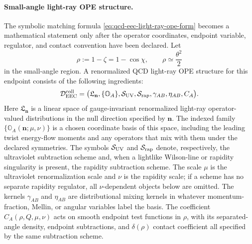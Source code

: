 \paragraph{Small-angle light-ray OPE structure.}
The symbolic matching formula \eqref{eq:qcd-eec-light-ray-ope-form} becomes
a mathematical statement only after the operator coordinates, endpoint
variable, regulator, and contact convention have been declared.  Let
\[
  \rho:=1-\zeta=1-\cos\chi,\qquad
  \rho\simeq \frac{\theta^2}{2}
\]
in the small-angle region.  A renormalized QCD light-ray OPE structure for this
endpoint consists of the following ingredients:
\[
  \mathcal D_{\rm EEC}^{\rm coll}
  =
  \bigl(
    \mathfrak L_{\mathbf n},\{\mathbb O_A\},
    \mathcal S_{\rm UV},\mathcal S_{\rm rap},
    \gamma_{AB},\eta_{AB},C_A
  \bigr).
\]
Here \(\mathfrak L_{\mathbf n}\) is a linear space of gauge-invariant
renormalized light-ray operator-valued distributions in the null direction
specified by \(\mathbf n\).  The indexed family
\(\{\mathbb O_A(\mathbf n;\mu,\nu)\}\) is a chosen coordinate basis of this
space, including the leading twist energy-flow moments and any operators
that mix with them under the declared symmetries.  The symbols
\(\mathcal S_{\rm UV}\) and \(\mathcal S_{\rm rap}\) denote, respectively,
the ultraviolet subtraction scheme and, when a lightlike Wilson-line or
rapidity singularity is present, the rapidity subtraction scheme.  The scale
\(\mu\) is the ultraviolet renormalization scale and \(\nu\) is the rapidity
scale; if a scheme has no separate rapidity regulator, all \(\nu\)-dependent
objects below are omitted.  The kernels \(\gamma_{AB}\) and \(\eta_{AB}\)
are distributional mixing kernels in whatever momentum-fraction, Mellin, or
angular variables label the basis.  The coefficient \(C_A(\rho,Q,\mu,\nu)\)
acts on smooth endpoint test functions in \(\rho\), with its separated-angle
density, endpoint subtractions, and \(\delta(\rho)\) contact coefficient all
specified by the same subtraction scheme.

